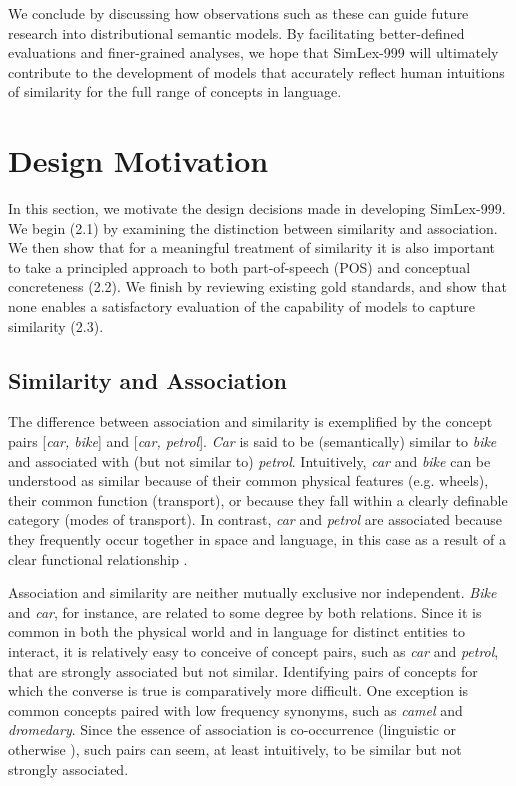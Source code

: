 \documentclass[fullname]{clv2}
\begin{document}
We conclude by discussing how observations such as these can guide future research into distributional semantic models. By facilitating better-defined evaluations and finer-grained analyses, we hope that SimLex-999 will ultimately contribute to the development of models that accurately reflect human intuitions of similarity for the full range of concepts in language. 

\section{Design Motivation}

In this section, we motivate the design decisions made in developing SimLex-999. We begin (2.1) by examining the distinction between similarity and association. We then show that for a meaningful treatment of similarity it is also important to take a principled approach to  both part-of-speech (POS) and conceptual concreteness (2.2). We finish by reviewing existing gold standards, and show that none enables a satisfactory evaluation of the capability of models to capture similarity (2.3).

\subsection{Similarity and Association}

The difference between association and similarity is exemplified by the concept pairs [\emph{car, bike}] and [\emph{car, petrol}]. \emph{Car} is said to be (semantically) similar to \emph{bike} and associated with (but not similar to) \emph{petrol}. Intuitively, \emph{car} and \emph{bike} can be understood as similar because of their common physical features (e.g. wheels), their common function (transport), or because they fall within a clearly definable category (modes of transport). In contrast, \emph{car} and \emph{petrol} are associated because they frequently occur together in space and language, in this case as a result of a clear functional relationship \cite{plaut1995semantic,mcrae2012semantic}. 

Association and similarity are neither mutually exclusive nor independent. \emph{Bike} and \emph{car}, for instance, are related to some degree by both relations. Since it is common in both the physical world and in language for distinct entities to interact, it is relatively easy to conceive of concept pairs, such as \emph{car} and \emph{petrol}, that are strongly associated but not similar. Identifying pairs of concepts for which the converse is true is comparatively more difficult. One exception is common concepts paired with low frequency synonyms, such as \emph{camel} and \emph{dromedary}. Since the essence of association is co-occurrence (linguistic or otherwise \cite{mcrae2012semantic}), such pairs can seem, at least intuitively, to be similar but not strongly associated.  
\end{document}
